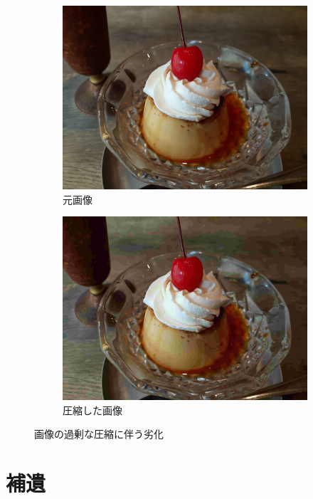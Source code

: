 \documentclass[../../index]{subfiles}
\begin{document}
\begin{figure}[htbp]
  \centering
  \begin{subfigure}{0.5\linewidth}
    \centering
    \includegraphics[width=\smallfiguresize]{pudding.jpeg}
    \caption{元画像}
  \end{subfigure}%
  \begin{subfigure}{0.5\linewidth}
    \centering
    \includegraphics[width=\smallfiguresize]{worse.jpeg}
    \caption{圧縮した画像}
  \end{subfigure}
  \caption{画像の過剰な圧縮に伴う劣化}
  \label{figure:image_compression}
\end{figure}

\section{補遺}
\end{document}
